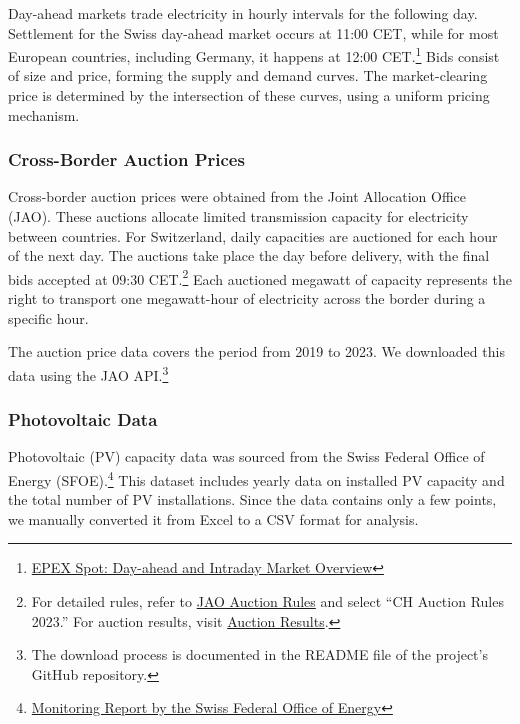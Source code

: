 \documentclass[12pt]{article}
\begin{document}
Day-ahead markets trade electricity in hourly intervals for the following day. Settlement for the Swiss day-ahead market occurs at 11:00 CET, while for most European countries, including Germany, it happens at 12:00 CET.\footnote{\href{https://www.epexspot.com/en/basicspowermarket\#day-ahead-and-intraday-the-backbone-of-the-european-spot-market}{EPEX Spot: Day-ahead and Intraday Market Overview}} Bids consist of size and price, forming the supply and demand curves. The market-clearing price is determined by the intersection of these curves, using a uniform pricing mechanism.

\subsubsection*{Cross-Border Auction Prices}

Cross-border auction prices were obtained from the Joint Allocation Office (JAO). These auctions allocate limited transmission capacity for electricity between countries. For Switzerland, daily capacities are auctioned for each hour of the next day. The auctions take place the day before delivery, with the final bids accepted at 09:30 CET.\footnote{For detailed rules, refer to \href{https://www.jao.eu/resource-center/auction-rules}{JAO Auction Rules} and select ``CH Auction Rules 2023.'' For auction results, visit \href{https://www.jao.eu/auctions\#/}{Auction Results}.} Each auctioned megawatt of capacity represents the right to transport one megawatt-hour of electricity across the border during a specific hour.

The auction price data covers the period from 2019 to 2023. We downloaded this data using the JAO API.\footnote{The download process is documented in the README file of the project's GitHub repository.}

\subsubsection*{Photovoltaic Data}

Photovoltaic (PV) capacity data was sourced from the Swiss Federal Office of Energy (SFOE).\footnote{\href{https://www.bfe.admin.ch/bfe/de/home/versorgung/statistik-und-geodaten/monitoring-energiestrategie-2050.exturl.html/aHR0cHM6Ly9wdWJkYi5iZmUuYWRtaW4uY2gvZGUvcHVibGljYX/Rpb24vZG93bmxvYWQvMTAzMjI=.html}{Monitoring Report by the Swiss Federal Office of Energy}} This dataset includes yearly data on installed PV capacity and the total number of PV installations. Since the data contains only a few points, we manually converted it from Excel to a CSV format for analysis.
\end{document}

